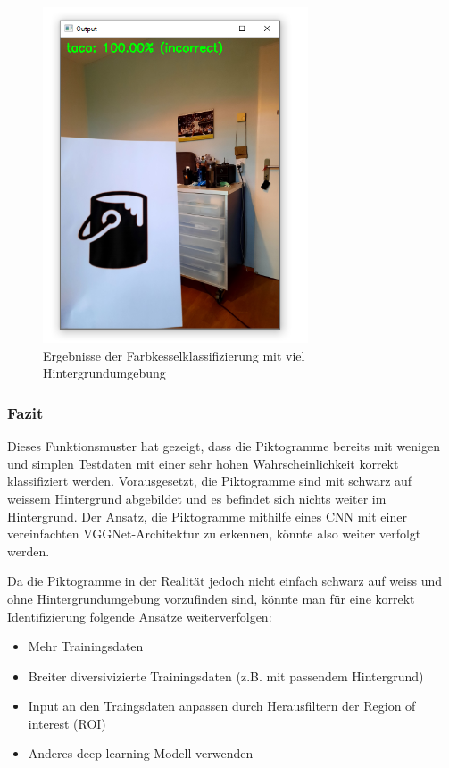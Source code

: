 \begin{figure}[H]
  \includegraphics[width=0.7\textwidth]{img/piktogrammerkennung/notClassifiedBucketBG.png}
  \centering
  \caption{Ergebnisse der Farbkesselklassifizierung mit viel Hintergrundumgebung}
\end{figure}

\newpage

\subsubsection{Fazit}
Dieses Funktionsmuster hat gezeigt, dass die Piktogramme bereits mit wenigen und simplen Testdaten mit einer sehr hohen Wahrscheinlichkeit korrekt klassifiziert werden. Vorausgesetzt, die Piktogramme sind mit schwarz auf weissem Hintergrund abgebildet und es befindet sich nichts weiter im Hintergrund. Der Ansatz, die Piktogramme mithilfe eines CNN mit einer vereinfachten VGGNet-Architektur zu erkennen, könnte also weiter verfolgt werden.  

Da die Piktogramme in der Realität jedoch nicht einfach schwarz auf weiss und ohne Hintergrundumgebung vorzufinden sind, könnte man für eine korrekt Identifizierung folgende Ansätze weiterverfolgen:
\begin{itemize}
    \item Mehr Trainingsdaten
    \item Breiter diversivizierte Trainingsdaten (z.B. mit passendem Hintergrund)
    \item Input an den Traingsdaten anpassen durch Herausfiltern der Region of interest (ROI)
    \item Anderes deep learning Modell verwenden
 \end{itemize}
 
